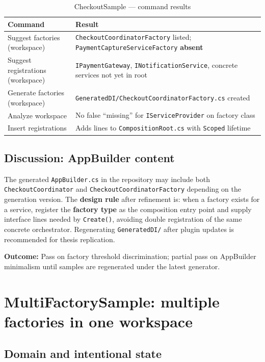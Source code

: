 \begin{table}[htbp]
\centering
\caption{CheckoutSample --- command results}
\label{tab:checkout-results}
\begin{tabular}{|p{4.5cm}|p{8.8cm}|}
\hline
\textbf{Command} & \textbf{Result} \\
\hline
Suggest factories (workspace) & \texttt{CheckoutCoordinatorFactory} listed; \texttt{PaymentCaptureServiceFactory} \textbf{absent} \\
\hline
Suggest registrations (workspace) & \texttt{IPaymentGateway}, \texttt{INotificationService}, concrete services not yet in root \\
\hline
Generate factories (workspace) & \texttt{GeneratedDI/CheckoutCoordinatorFactory.cs} created \\
\hline
Analyze workspace & No false ``missing'' for \texttt{IServiceProvider} on factory class \\
\hline
Insert registrations & Adds lines to \texttt{CompositionRoot.cs} with \texttt{Scoped} lifetime \\
\hline
\end{tabular}
\end{table}

\subsection{Discussion: AppBuilder content}

The generated \texttt{AppBuilder.cs} in the repository may include both \texttt{CheckoutCoordinator} and \texttt{CheckoutCoordinatorFactory} depending on the generation version. The \textbf{design rule} after refinement is: when a factory exists for a service, register the \textbf{factory type} as the composition entry point and supply interface lines needed by \texttt{Create()}, avoiding double registration of the same concrete orchestrator. Regenerating \texttt{GeneratedDI/} after plugin updates is recommended for thesis replication.

\textbf{Outcome:} Pass on factory threshold discrimination; partial pass on AppBuilder minimalism until samples are regenerated under the latest generator.

\section{MultiFactorySample: multiple factories in one workspace}
\label{chap5:multifactory}

\subsection{Domain and intentional state}

